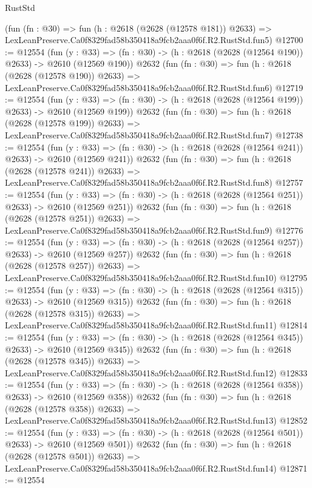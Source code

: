 \begin{lexlean}{RustStd}
\begin{coremodule}
    (fun (fn : @30) =>
    fun (h : @2618 (@2628 (@12578 @181)) @2633) =>
    LexLeanPreserve.Ca0f8329fad58b350418a9fcb2aaa0f6f.R2.RustStd.fun5)
@12700 := @12554
    (fun (y : @33) => (fn : @30) -> (h : @2618 (@2628 (@12564 @190)) @2633) -> @2610 (@12569 @190))
    @2632
    (fun (fn : @30) =>
    fun (h : @2618 (@2628 (@12578 @190)) @2633) =>
    LexLeanPreserve.Ca0f8329fad58b350418a9fcb2aaa0f6f.R2.RustStd.fun6)
@12719 := @12554
    (fun (y : @33) => (fn : @30) -> (h : @2618 (@2628 (@12564 @199)) @2633) -> @2610 (@12569 @199))
    @2632
    (fun (fn : @30) =>
    fun (h : @2618 (@2628 (@12578 @199)) @2633) =>
    LexLeanPreserve.Ca0f8329fad58b350418a9fcb2aaa0f6f.R2.RustStd.fun7)
@12738 := @12554
    (fun (y : @33) => (fn : @30) -> (h : @2618 (@2628 (@12564 @241)) @2633) -> @2610 (@12569 @241))
    @2632
    (fun (fn : @30) =>
    fun (h : @2618 (@2628 (@12578 @241)) @2633) =>
    LexLeanPreserve.Ca0f8329fad58b350418a9fcb2aaa0f6f.R2.RustStd.fun8)
@12757 := @12554
    (fun (y : @33) => (fn : @30) -> (h : @2618 (@2628 (@12564 @251)) @2633) -> @2610 (@12569 @251))
    @2632
    (fun (fn : @30) =>
    fun (h : @2618 (@2628 (@12578 @251)) @2633) =>
    LexLeanPreserve.Ca0f8329fad58b350418a9fcb2aaa0f6f.R2.RustStd.fun9)
@12776 := @12554
    (fun (y : @33) => (fn : @30) -> (h : @2618 (@2628 (@12564 @257)) @2633) -> @2610 (@12569 @257))
    @2632
    (fun (fn : @30) =>
    fun (h : @2618 (@2628 (@12578 @257)) @2633) =>
    LexLeanPreserve.Ca0f8329fad58b350418a9fcb2aaa0f6f.R2.RustStd.fun10)
@12795 := @12554
    (fun (y : @33) => (fn : @30) -> (h : @2618 (@2628 (@12564 @315)) @2633) -> @2610 (@12569 @315))
    @2632
    (fun (fn : @30) =>
    fun (h : @2618 (@2628 (@12578 @315)) @2633) =>
    LexLeanPreserve.Ca0f8329fad58b350418a9fcb2aaa0f6f.R2.RustStd.fun11)
@12814 := @12554
    (fun (y : @33) => (fn : @30) -> (h : @2618 (@2628 (@12564 @345)) @2633) -> @2610 (@12569 @345))
    @2632
    (fun (fn : @30) =>
    fun (h : @2618 (@2628 (@12578 @345)) @2633) =>
    LexLeanPreserve.Ca0f8329fad58b350418a9fcb2aaa0f6f.R2.RustStd.fun12)
@12833 := @12554
    (fun (y : @33) => (fn : @30) -> (h : @2618 (@2628 (@12564 @358)) @2633) -> @2610 (@12569 @358))
    @2632
    (fun (fn : @30) =>
    fun (h : @2618 (@2628 (@12578 @358)) @2633) =>
    LexLeanPreserve.Ca0f8329fad58b350418a9fcb2aaa0f6f.R2.RustStd.fun13)
@12852 := @12554
    (fun (y : @33) => (fn : @30) -> (h : @2618 (@2628 (@12564 @501)) @2633) -> @2610 (@12569 @501))
    @2632
    (fun (fn : @30) =>
    fun (h : @2618 (@2628 (@12578 @501)) @2633) =>
    LexLeanPreserve.Ca0f8329fad58b350418a9fcb2aaa0f6f.R2.RustStd.fun14)
@12871 := @12554

\end{coremodule}
\end{lexlean}
